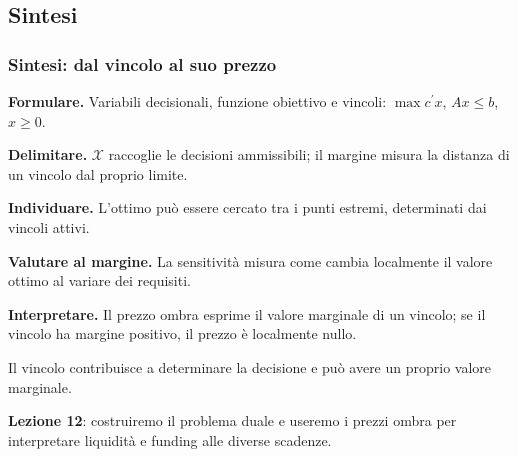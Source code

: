 

\subsection{Sintesi}%

\begin{frame}%
%

\frametitle{Sintesi: dal vincolo al suo prezzo}%
%

%


\begin{stepenumerate}
\item[1.] \textbf{Formulare.} Variabili decisionali, funzione obiettivo e
vincoli: $\max c^{\prime}x$, $Ax\leq b$, $x\geq0$.

\item[2.] \textbf{Delimitare.} $\mathcal{X}$ raccoglie le decisioni
ammissibili; il margine misura la distanza di un vincolo dal proprio limite.

\item[3.] \textbf{Individuare.} L'ottimo pu\`{o} essere cercato tra i punti
estremi, determinati dai vincoli attivi.

\item[4.] \textbf{Valutare al margine.} La sensitivit\`{a} misura come cambia
localmente il valore ottimo al variare dei requisiti.

\item[5.] \textbf{Interpretare.} Il prezzo ombra esprime il valore marginale
di un vincolo; se il vincolo ha margine positivo, il prezzo \`{e} localmente nullo.
\end{stepenumerate}

\begin{center}
{\small Il vincolo contribuisce a determinare la decisione e pu\`{o} avere un
proprio valore marginale. }
\end{center}

{\small \smallskip}

{\small \textbf{Lezione 12}: costruiremo il problema duale e useremo i prezzi
ombra per interpretare liquidit\`{a} e funding alle diverse scadenze. }%

\transboxout
\end{frame}%




